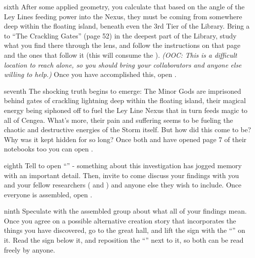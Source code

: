 \documentclass[notebook]{GL2020} %
\begin{document}
\begin{page}{sixth}
After some applied geometry, you calculate that based on the angle of the Ley Lines feeding power into the Nexus, they must be coming from somewhere deep within the floating island, beneath even the 3rd Tier of the Library. Bring a \iCrystalLens{} to “The Crackling Gates” (page 52) in the deepest part of the Library, study what you find there through the lens, and follow the instructions on that page and the ones that follow it (this will consume the \iCrystalLens{}). \emph{(OOC: This is a difficult location to reach alone, so you should bring your collaborators and anyone else willing to help.)} Once you have accomplished this, open .
\end{page}

\begin{page}{seventh}
The shocking truth begins to emerge: The Minor Gods are imprisoned behind gates of crackling lightning deep within the floating island, their magical energy being siphoned off to fuel the Ley Line Nexus that in turn feeds magic to all of Cengea. What’s more, their pain and suffering seems to be fueling the chaotic and destructive energies of the Storm itself. But how did this come to be? Why was it kept hidden for so long? Once both \cScholarship{} and \cEbbPriest{} have opened page 7 of their notebooks too you can open .
\end{page}

\begin{page}{eighth}
Tell \cHistory{} to open \cHistory{\their} “\mWTwo{}” - something about this investigation has jogged \cHistory{\their} memory with an important detail. Then, invite \cHistory{} to come discuss your findings with you and your fellow researchers ( \cScholarship{} and \cEbbPriest{}) and anyone else they wish to include.  Once everyone is assembled, open .
\end{page}

\begin{page}{ninth}
Speculate with the assembled group about what all of your findings mean. Once you agree on a possible alternative creation story that incorporates the things you have discovered, go to the great hall, and lift the sign with the ``\sCreationMythOfficial{}'' on it. Read the sign below it, and reposition the ``\sCreationMythOfficial{}'' next to it, so both can be read freely by anyone.
\end{page}

\endnotebook
\end{document}
